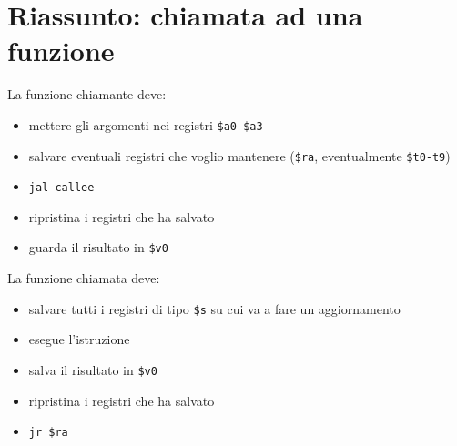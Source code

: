 \documentclass[../main.tex]{subfiles}
\begin{document}
\begin{table}[h!]
\begin{minipage}{.4\linewidth}
    \end{minipage}
\end{table}

\section{Riassunto: chiamata ad una funzione}
La funzione chiamante deve:
\begin{itemize}
    \item mettere gli argomenti nei registri \texttt{\$a0-\$a3}
    \item salvare eventuali registri che voglio mantenere (\texttt{\$ra},
    eventualmente \texttt{\$t0-t9})
    \item \texttt{jal callee}
    \item ripristina i registri che ha salvato
    \item guarda il risultato in \texttt{\$v0}
\end{itemize}
\vspace*{5mm}
La funzione chiamata deve:
\begin{itemize}
    \item salvare tutti i registri di tipo \texttt{\$s} su cui va a fare un aggiornamento
    \item esegue l'istruzione
    \item salva il risultato in \texttt{\$v0}
    \item ripristina i registri che ha salvato
    \item \texttt{jr \$ra}
\end{itemize}
\end{document}
